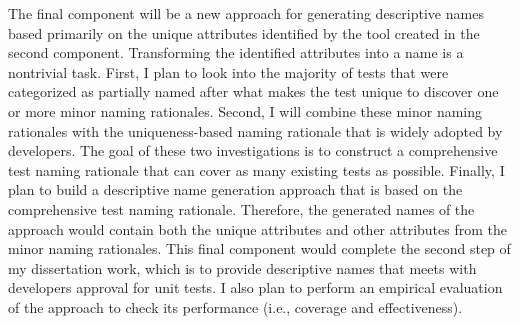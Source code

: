 The final component will be a new approach for generating descriptive names based primarily on the unique attributes identified by the tool created in the second component.
%
Transforming the identified attributes into a name is a nontrivial task.
%
First, I plan to look into the majority of tests that were categorized as partially named after what makes the test unique to discover one or more minor naming rationales.
%
Second, I will combine these minor naming rationales with the uniqueness-based naming rationale that is widely adopted by developers.
%
The goal of these two investigations is to construct a comprehensive test naming rationale that can cover as many existing tests as possible.
%
Finally, I plan to build a descriptive name generation approach that is based on the comprehensive test naming rationale.
%
Therefore, the generated names of the approach would contain both the unique attributes and other attributes from the minor naming rationales.
%
This final component would complete the second step of my dissertation work, which is to provide descriptive names that meets with developers approval for unit tests.
%
I also plan to perform an empirical evaluation of the approach to check its performance (i.e., coverage and effectiveness).